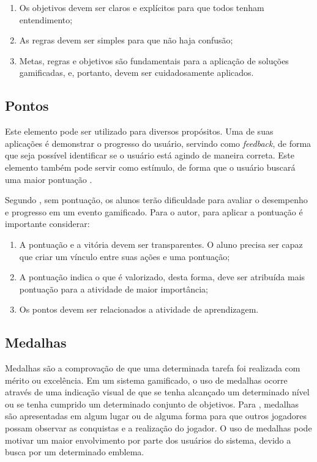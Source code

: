\documentclass[
	12pt,				%
	oneside,			%
	a4paper,			%
	english,			%
	french,				%
	spanish,			%
	brazil,				%
	]{abntex2}
\begin{document}
\begin{enumerate}
\item Os objetivos devem ser claros e explícitos para que todos tenham entendimento;
\item As regras devem ser simples para que não haja confusão;
\item Metas, regras e objetivos são fundamentais para a aplicação de soluções gamificadas, e, portanto, devem ser cuidadosamente aplicados.
\end{enumerate}

\subsection{Pontos}

Este elemento pode ser utilizado para diversos propósitos. Uma de suas aplicações é demonstrar o progresso do usuário, servindo como \textit{feedback}, de forma que seja possível identificar se o usuário está agindo de maneira correta. Este elemento também pode servir como estímulo, de forma que o usuário buscará uma maior pontuação \cite{kaap:2014}.

Segundo \citet{andre2018}, sem pontuação, os alunos terão dificuldade para avaliar o desempenho e progresso em um evento gamificado. Para o autor, para aplicar a pontuação é importante considerar:

\begin{enumerate}
\item A pontuação e a vitória devem ser transparentes. O aluno precisa ser capaz que criar um vínculo entre suas ações e uma pontuação;
\item A pontuação indica o que é valorizado, desta forma, deve ser atribuída mais pontuação para a atividade de maior importância;
\item Os pontos devem ser relacionados a atividade de aprendizagem.
\end{enumerate}

\subsection{Medalhas}

Medalhas são a comprovação de que uma determinada tarefa foi realizada com mérito ou excelência. Em um sistema gamificado, o uso de medalhas ocorre através de uma indicação visual de que se tenha alcançado um determinado nível ou se tenha cumprido um determinado conjunto de objetivos. Para \citet{deterding2011game}, medalhas são apresentadas em algum lugar ou de alguma forma para que outros jogadores possam observar as conquistas e a realização do jogador. O uso de medalhas pode motivar um maior envolvimento por parte dos usuários do sistema, devido a busca por um determinado emblema.
    
\end{document}
